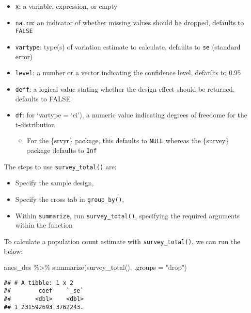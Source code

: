 \documentclass[
]{krantz}
\makeatletter
\newenvironment{Shaded}{\begin{snugshade}}{\end{snugshade}}
\newcommand{\AttributeTok}[1]{\textcolor[rgb]{0.61,0.61,0.61}{#1}}
\newcommand{\FunctionTok}[1]{\textcolor[rgb]{0,0,0}{#1}}
\newcommand{\NormalTok}[1]{#1}
\newcommand{\SpecialCharTok}[1]{\textcolor[rgb]{0,0,0}{#1}}
\newcommand{\StringTok}[1]{\textcolor[rgb]{0.5,0.5,0.5}{#1}}
\providecommand{\tightlist}{%
  \setlength{\itemsep}{0pt}\setlength{\parskip}{0pt}}
\newenvironment{kframe}{%
\medskip{}
\setlength{\fboxsep}{.8em}
 \def\at@end@of@kframe{}%
 \ifinner\ifhmode%
  \def\at@end@of@kframe{\end{minipage}}%
  \begin{minipage}{\columnwidth}%
 \fi\fi%
 \def\FrameCommand##1{\hskip\@totalleftmargin \hskip-\fboxsep
 \colorbox{shadecolor}{##1}\hskip-\fboxsep
     \hskip-\linewidth \hskip-\@totalleftmargin \hskip\columnwidth}%
 \MakeFramed {\advance\hsize-\width
   \@totalleftmargin\z@ \linewidth\hsize
   \@setminipage}}%
 {\par\unskip\endMakeFramed%
 \at@end@of@kframe}
\renewenvironment{Shaded}{\begin{kframe}}{\end{kframe}}
\makeatother
\begin{document}
\begin{itemize}
\tightlist
\item
  \texttt{x}: a variable, expression, or empty
\item
  \texttt{na.rm}: an indicator of whether missing values should be dropped, defaults to \texttt{FALSE}
\item
  \texttt{vartype}: type(s) of variation estimate to calculate, defaults to \texttt{se} (standard error)
\item
  \texttt{level}: a number or a vector indicating the confidence level, defaults to 0.95
\item
  \texttt{deff}: a logical value stating whether the design effect should be returned, defaults to FALSE
\item
  \texttt{df}: for `vartype = `ci'), a numeric value indicating degrees of freedome for the t-distribution

  \begin{itemize}
  \tightlist
  \item
    For the \{srvyr\} package, this defaults to \texttt{NULL} whereas the \{survey\} package defaults to \texttt{Inf}
  \end{itemize}
\end{itemize}

The steps to use \texttt{survey\_total()} are:

\begin{itemize}
\tightlist
\item
  Specify the sample design,
\item
  Specify the cross tab in \texttt{group\_by()},
\item
  Within \texttt{summarize}, run \texttt{survey\_total()}, specifying the required arguments within the function
\end{itemize}

To calculate a population count estimate with \texttt{survey\_total()}, we can run the below:

\begin{Shaded}
\begin{Highlighting}[]
\NormalTok{anes\_des }\SpecialCharTok{\%\textgreater{}\%}
  \FunctionTok{summarize}\NormalTok{(}\FunctionTok{survey\_total}\NormalTok{(), }\AttributeTok{.groups =} \StringTok{"drop"}\NormalTok{)}
\end{Highlighting}
\end{Shaded}

\begin{verbatim}
## # A tibble: 1 x 2
##        coef    `_se`
##       <dbl>    <dbl>
## 1 231592693 3762243.
\end{verbatim}
\end{document}
